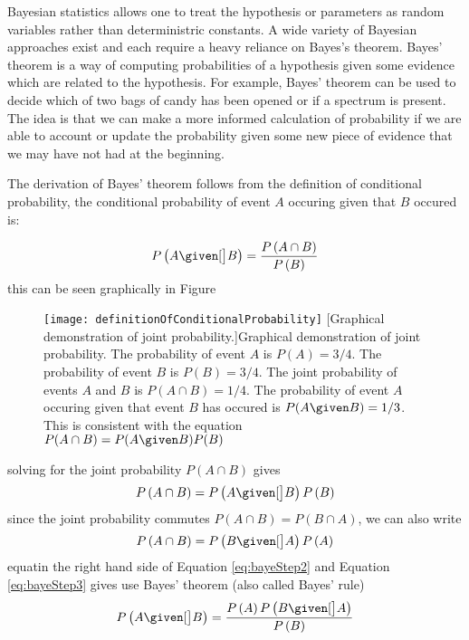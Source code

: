 Bayesian statistics allows one to treat the hypothesis or parameters as random variables rather than deterministric constants. A wide variety of Bayesian approaches exist and each require a heavy reliance on Bayes's theorem. Bayes' theorem is a way of computing probabilities of a hypothesis given some evidence which are related to the hypothesis. For example, Bayes' theorem can be used to decide which of two bags of candy has been opened or if a spectrum is present. The idea is that we can make a more informed calculation of probability if we are able to account or update the probability given some new piece of evidence that we may have not had at the beginning.

The derivation of Bayes' theorem follows from the definition of conditional probability, the conditional probability of event $A$ occuring given that $B$ occured is:

\begin{equation}
	P \left( A \given[\big] B \right) = \frac{ P \left( A \cap B \right) }{ P \left( B \right)}
\end{equation} 
this can be seen graphically in Figure


\begin{figure}
	\texttt{[image: definitionOfConditionalProbability]}
	[Graphical demonstration of joint probability.]{Graphical demonstration of joint probability. The probability of event $A$ is $P(A)=3/4$. The probability of event $B$ is $P(B)=3/4$. The joint probability of events $A$ and $B$ is $P(A \cap B) = 1/4$. The probability of event $A$ occuring given that event $B$ has occured is $P( A \given B) = 1/3$. This is consistent with the equation $ P(A \cap B) = P(A \given B) P(B) $}
	\label{fig:definitionOfConditionalProbability}
\end{figure}

solving for the joint probability $ P \left( A \cap B \right) $ gives
\begin{equation}
 P \left( A \cap B \right) =	P \left( A \given[\big] B \right)  P \left( B \right)
\label{eq:bayeStep2}
\end{equation} 
since the joint probability commutes $ P \left( A \cap B \right) = P \left( B \cap A \right) $, we can also write
\begin{equation}
 P \left( A \cap B \right) =	P \left( B \given[\big] A \right)  P \left( A \right)
\label{eq:bayeStep3}
\end{equation} 
equatin the right hand side of Equation \ref{eq:bayeStep2} and Equation \ref{eq:bayeStep3} gives use Bayes' theorem (also called Bayes' rule)
\begin{equation}
	P \left( A \given[\big] B \right) = \frac{ P \left( A \right) P \left( B \given[\big] A \right) }{ P \left( B \right) }
\end{equation}

